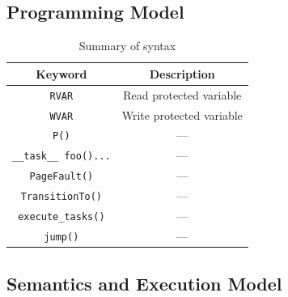 \subsection{Programming Model}
\label{sec:overview_programming_model}

\begin{table}
	\centering
	\footnotesize
	\begin{tabular}{|c|c|}
		\hline
		Keyword & Description\\
		\hline\hline
		\texttt{RVAR} & Read protected variable\\
		\texttt{WVAR} & Write protected variable\\
		\texttt{P()} & ---\\
		\texttt{\_\_task\_\_ foo(){...}} & ---\\
		\texttt{PageFault()} & --- \\
		\texttt{TransitionTo()} & --- \\
		\texttt{execute\_tasks()} & ---\\
		\texttt{jump()} & ---\\
		\hline
	\end{tabular}
\caption{Summary of \sys syntax}
\label{tab:viper_syntax}
\end{table}

\subsection{Semantics and Execution Model}
\label{sec:overview_semantics}

